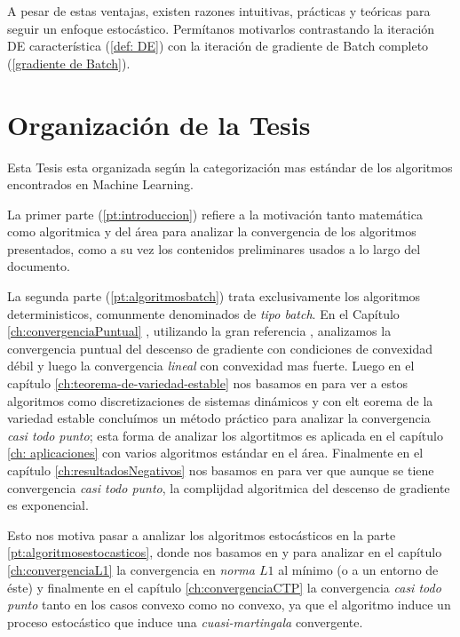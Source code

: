 	A pesar de estas ventajas, existen razones intuitivas, pr\'acticas y te\'oricas para seguir un enfoque estoc\'astico. Perm\'itanos motivarlos contrastando la iteraci\'on DE caracter\'istica (\ref{def: DE}) con la iteraci\'on de gradiente de Batch completo (\ref{gradiente de Batch}).

\section{Organizaci\'on de la Tesis}

Esta Tesis esta organizada seg\'un la categorizaci\'on mas est\'andar de los algoritmos encontrados en Machine Learning.

La primer parte (\ref{pt:introduccion}) refiere a la motivaci\'on tanto matem\'atica como algoritmica y del \'area para analizar la convergencia de los algoritmos presentados, como a su vez los contenidos preliminares usados a lo largo del documento.

La segunda parte (\ref{pt:algoritmosbatch}) trata exclusivamente los algoritmos deterministicos, comunmente denominados de \textit{tipo batch}. En el Cap\'itulo \ref{ch:convergenciaPuntual} , utilizando la gran referencia \cite{nesterov:2004}, analizamos la convergencia puntual del descenso de gradiente con condiciones de convexidad d\'ebil y luego la convergencia \textit{lineal} con convexidad mas fuerte. Luego en el cap\'itulo \ref{ch:teorema-de-variedad-estable} nos basamos en \cite{lee:2017} para ver a estos algoritmos como discretizaciones de sistemas din\'amicos y con elt eorema de la variedad estable conclu\'imos un m\'etodo pr\'actico para analizar la convergencia \textit{casi todo punto}; esta forma de analizar los algortitmos es aplicada en el cap\'itulo \ref{ch: aplicaciones} con varios algoritmos est\'andar en el \'area. Finalmente en el cap\'itulo \ref{ch:resultadosNegativos} nos basamos en \cite{du:2017} para ver que aunque se tiene convergencia \textit{casi todo punto}, la complijdad algoritmica del descenso de gradiente es exponencial.

Esto nos motiva pasar a analizar los algoritmos estoc\'asticos en la parte \ref{pt:algoritmosestocasticos}, donde nos basamos en \cite{bottou:1999} y \cite{bottou:2016} para analizar en el cap\'itulo \ref{ch:convergenciaL1} la convergencia en \textit{norma $L1$} al m\'inimo (o a un entorno de \'este) y finalmente en el cap\'itulo \ref{ch:convergenciaCTP} la convergencia \textit{casi todo punto} tanto en los casos convexo como no convexo, ya que el algoritmo induce un proceso estoc\'astico que induce una \textit{cuasi-martingala} convergente.

\smallskip
